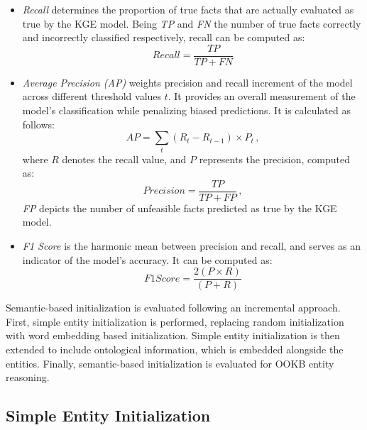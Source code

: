 \begin{itemize}
    \item \textit{Recall} determines the proportion of true facts that are actually evaluated as true by the KGE model. Being \textit{TP} and \textit{FN} the number of true facts correctly and incorrectly classified respectively, recall can be computed as:
    \begin{equation}
        Recall = \frac{TP}{TP+FN}
    \end{equation}
    
    \item \textit{Average Precision (AP)} weights precision and recall increment of the model across different threshold values $t$. It provides an overall measurement of the model's classification while penalizing biased predictions. It is calculated as follows:
    \begin{equation}
        AP = \sum_{t} (R_t - R_{t-1}) \times P_t \,,
    \end{equation}
    where $R$ denotes the recall value, and $P$ represents the precision, computed as:
    \begin{equation}
        Precision = \frac{TP}{TP+FP} \,,
    \end{equation}
    \textit{FP} depicts the number of unfeasible facts predicted as true by the KGE model.
    
    \item \textit{F1 Score} is the harmonic mean between precision and recall, and serves as an indicator of the model's accuracy. It can be computed as:
    \begin{equation}
        F1 Score = \frac{2 (P \times R)}{(P + R)}
    \end{equation}
\end{itemize}

Semantic-based initialization is evaluated following an incremental approach. First, simple entity initialization is performed, replacing random initialization with word embedding based initialization. Simple entity initialization is then extended to include ontological information, which is embedded alongside the entities. Finally, semantic-based initialization is evaluated for OOKB entity reasoning.

\subsection{Simple Entity Initialization}


